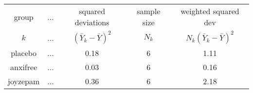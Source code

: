 \small
\vspace*{6pt}
\begin{tabular}{c|c |c|c|c}
 group & \hspace{.25cm}...\hspace{.25cm} & squared deviations & sample size & weighted squared dev\\  
  $k$  & ... & $(\bar{Y}_{k} - \bar{Y})^2$ & $N_k$ & $N_k (\bar{Y}_{k} - \bar{Y})^2$\\  \hline
placebo   & ... &  0.18 & 6 & 1.11\\
anxifree  & ... &  0.03 & 6 & 0.16\\
joyzepam  & ... &  0.36 & 6 & 2.18\\
\end{tabular}
\vspace*{6pt}
\normalsize


